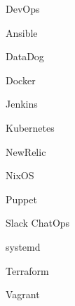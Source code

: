 \begin{skillset}{DevOps}
  \item Ansible
  \item DataDog
  \item Docker
  \item Jenkins
  \item Kubernetes
  \item NewRelic
  \item NixOS
  \item Puppet
  \item Slack ChatOps
  \item systemd
  \item Terraform
  \item Vagrant
\end{skillset}
